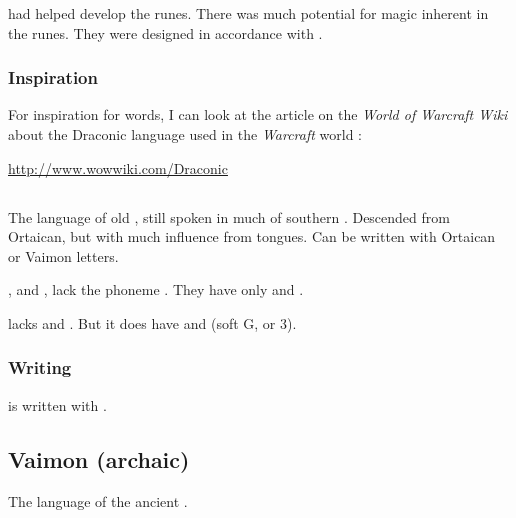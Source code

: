 \Sethicus had helped develop the runes. 
There was much potential for magic inherent in the runes. 
They were designed in accordance with . 





\subsubsection{Inspiration}
For inspiration for \Draconic words, I can look at the article on the \emph{World of Warcraft Wiki} about the Draconic language used in the \emph{Warcraft} world \cite{VideoGame:Warcraft}: 

\href{http://www.wowwiki.com/Draconic}{http://www.wowwiki.com/Draconic}









\subsection{\Tepharin}
The language of old \Tephar, still spoken in much of southern \Velcad. 
Descended from Ortaican, but with much influence from \human{} tongues. 
Can be written with Ortaican or Vaimon letters. 

\Tepharin, and \Ortaican, lack the phoneme \txipa{[v]}. 
They have only \txipa{[w]} and \txipa{[hw]}. 

\Tepharin{} lacks \txipa{[z]} and \txipa{[S]}.
But it does have \txipa{[D]} and \txipa{[3]} (soft G, or 3). 










\subsubsection{Writing}
\Tepharin{} is written with . 









\subsection{Vaimon (archaic)}
The language of the ancient . 




